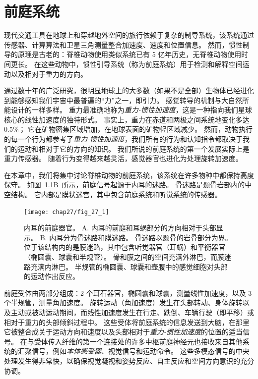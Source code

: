 \chapter{前庭系统} \label{chap:chap27}

现代交通工具在地球上和穿越地外空间的旅行依赖于复杂的制导系统，该系统通过传感器、计算算法和卫星三角测量整合加速度、速度和位置信息。
然而，惯性制导的原理是古老的：脊椎动物使用类似系统已有 5 亿年历史，无脊椎动物使用时间更长。
在这些动物中，惯性引导系统（称为前庭系统）用于检测和解释空间运动以及相对于重力的方向。


通过数十年的广泛研究，很明显地球上的大多数（如果不是全部）生物体已经进化到能够感知我们宇宙中最普遍的“力”之一，即引力。
感觉转导的机制与大自然所能设计的一样多样。
重力最准确地称为\textit{重力-惯性加速度}，这是一种指向我们星球核心的线性加速度的独特形式。
事实上，重力在赤道和两极之间系统地变化多达 0.5\%；
它在矿物密集区域增加，在地球表面的矿物轻区域减少。
然而，动物执行的每一个行为都参考了\textit{重力-惯性加速度}，我们所有的行为和认知指令都取决于我们的运动和相对于它的方向的知识。
我们所说的前庭系统的第一个发展实际上是重力传感器。
随着行为变得越来越灵活，感觉器官也进化为处理旋转加速度。


在本章中，我们将集中讨论脊椎动物的前庭系统，该系统在许多物种中都保持高度保守。
如图~\ref{fig:27_1}B~所示，前庭信号起源于内耳的迷路。
骨迷路是颞骨岩部内的中空结构。
它内部是膜状迷宫，其中包含前庭系统和听觉系统的传感器。


\begin{figure}[htbp]
	\centering
	\texttt{[image: chap27/fig\_27\_1]}
	\caption{内耳的前庭器官。
		A. 内耳的前庭和耳蜗部分的方向相对于头部显示。
		B. 内耳分为骨迷路和膜迷路。
		骨迷路以颞骨的岩骨部分为界。
		位于该结构内的是膜迷路，其中包含听觉器官（耳蜗）和平衡器官（椭圆囊、球囊和半规管）。
		骨和膜之间的空间充满外淋巴，而膜迷路充满内淋巴。
		半规管的椭圆囊、球囊和壶腹中的感觉细胞对头部的运动作出反应\cite{iurato2013submicroscopic}。}
	\label{fig:27_1}
\end{figure}


前庭受体由两部分组成：2 个耳石器官，椭圆囊和球囊，测量线性加速度，以及 3 个半规管，测量角加速度。
旋转运动（角加速度）发生在头部转动、身体旋转以及主动或被动运动期间，而线性加速度发生在行走、跌倒、车辆行驶（即平移）或相对于重力的头部倾斜过程中。
这些受体将前庭系统的信息发送到大脑，在那里它被整合成关于运动方向和速度以及头部相对于\textit{重力-惯性加速度}的位置的适当信号。
在与受体传入纤维的第一个连接处的许多中枢前庭神经元也接收来自其他系统的汇聚信号，例如\textit{本体感受器}、视觉信号和运动命令。
这些多模态信号的中央处理发生得非常快，以确保视觉凝视和姿势反应、自主反应和空间方向意识的充分协调。



